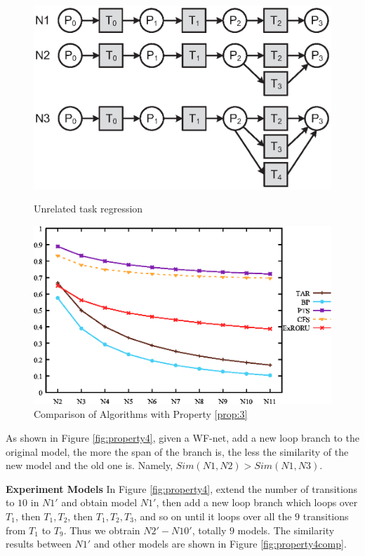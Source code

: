 \documentclass{llncs}
\begin{document}
\begin{figure}[ht]
\centering
\begin{minipage}[t]{0.45\textwidth}
	\centering
	\includegraphics[width=1\textwidth]{fig_property_3.eps}
	\caption{Unrelated task regression}
	\label{fig:property3}
\end{minipage}
\hspace{0.1in}
\begin{minipage}[t]{0.45\textwidth}
	\centering
	\includegraphics[width=1\textwidth]{fig_property_3_comp.eps}
	\caption{Comparison of Algorithms with Property \ref{prop:3}}
	\label{fig:property3comp}
\end{minipage}
\end{figure}

\begin{property}\label{prop:4}
As shown in Figure \ref{fig:property4}, given a WF-net, add a new loop branch to the original model, the more the span of the branch is, the less the similarity of the new model and the old one is. Namely, $Sim(N1,N2)>Sim(N1,N3)$.
\end{property}
\textbf{Experiment Models} In Figure \ref{fig:property4}, extend the number of transitions to $10$ in $N1'$ and obtain model $N1'$, then add a new loop branch which loops over $T_{1}$, then $T_{1},T_{2}$, then $T_{1},T_{2},T_{3}$, and so on until it loops over all the $9$ transitions from $T_{1}$ to $T_{9}$. Thus we obtrain $N2'-N10'$, totally $9$ models. The similarity results between $N1'$ and other models are shown in Figure \ref{fig:property4comp}.
\end{document}
